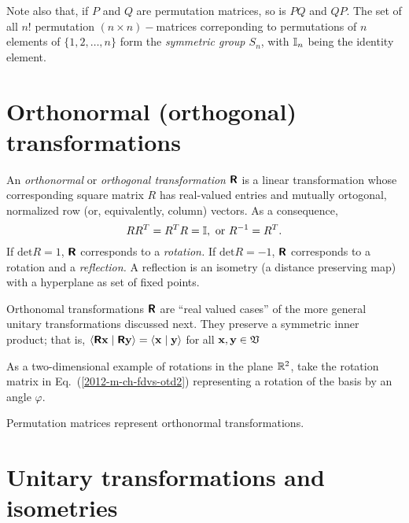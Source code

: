Note also that, if $P$ and $Q$ are permutation matrices, so is $PQ$ and $QP$.
The set of all $n!$
permutation $(n\times n)-$matrices correponding to permutations of $n$ elements of $\{ 1,2,\ldots ,n\}$ form the
{\em symmetric group $S_n$}, with ${\Bbb I}_n$ being the identity element.


\section{Orthonormal (orthogonal) transformations}

An {\em orthonormal} or {\em orthogonal transformation} $\textsf{\textbf{R}}$ is a linear transformation
whose corresponding square matrix $R$ has real-valued entries
and mutually ortogonal, normalized row (or, equivalently, column) vectors.
As a consequence,
\begin{equation}
RR^T= R^TR= {\Bbb I}, \textrm{ or } R^{-1}=R^T .
\end{equation}
If $\textrm{det} R=1$, $\textsf{\textbf{R}}$ corresponds to a {\em rotation.}
If $\textrm{det} R=-1$, $\textsf{\textbf{R}}$ corresponds to a rotation and a {\em reflection.}
A reflection is an isometry (a distance preserving map) with a hyperplane as set of fixed points.

Orthonomal transformations $\textsf{\textbf{R}}$ are ``real valued cases'' of the more general unitary transformations discussed next.
They preserve a symmetric inner product; that is,
$\langle \textsf{\textbf{R}}{\bf x}\mid \textsf{\textbf{R}}{\bf y} \rangle
=
\langle {\bf x}\mid {\bf y} \rangle$ for all ${\bf x} ,{\bf y} \in {\frak V}$


{\color{blue}
\bexample
As a  two-dimensional  example of rotations in the plane ${\Bbb R}^2$,
take the rotation matrix in Eq.~(\ref{2012-m-ch-fdvs-otd2})
representing a rotation of the basis by an angle $\varphi$.

Permutation matrices represent orthonormal transformations.
\eexample
}

\section{Unitary transformations and isometries}
\label{2014-m-ch-fdvs-unitary}

